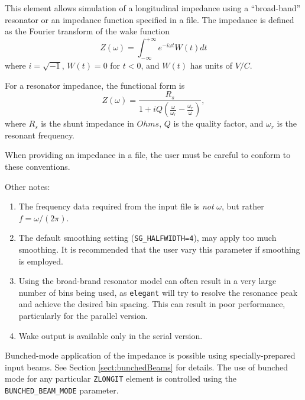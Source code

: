 This element allows simulation of a longitudinal impedance using a
``broad-band'' resonator or an impedance function specified in a file.
The impedance is defined as the Fourier transform of the wake function
\begin{equation}
Z(\omega) = \int_{-\infty}^{+\infty} e^{-i \omega t} W(t) dt
\end{equation}
where $i = \sqrt{-1}$, $W(t)=0$ for $t<0$, and $W(t)$ has units of $V/C$.

For a resonator impedance, the functional form is
\begin{equation}
Z(\omega) = \frac{R_s}{1 + iQ(\frac{\omega}{\omega_r} - \frac{\omega_r}{\omega})},
\end{equation}
where $R_s$ is the shunt impedance in $Ohms$, $Q$ is the quality
factor, and $\omega_r$ is the resonant frequency.

When providing an impedance in a file, the user must be careful to conform to these
conventions.

Other notes:
\begin{enumerate}
\item The frequency data required from the input file is {\em not} $\omega$, but rather
  $f = \omega/(2 \pi)$.
\item The default smoothing setting ({\tt SG\_HALFWIDTH=4}), may apply too much smoothing.
  It is recommended that the user vary this parameter if smoothing is employed.
\item Using the broad-brand resonator model can often result in a very large number of bins
 being used, as {\tt elegant} will try to resolve the resonance peak and achieve the desired
 bin spacing. This can result in poor performance, particularly for the parallel version.
\item Wake output is available only in the serial version.
\end{enumerate}

Bunched-mode application of the impedance is possible using specially-prepared input
beams. 
See Section \ref{sect:bunchedBeams} for details.
The use of bunched mode for any particular \verb|ZLONGIT| element is controlled using the \verb|BUNCHED_BEAM_MODE| parameter.
